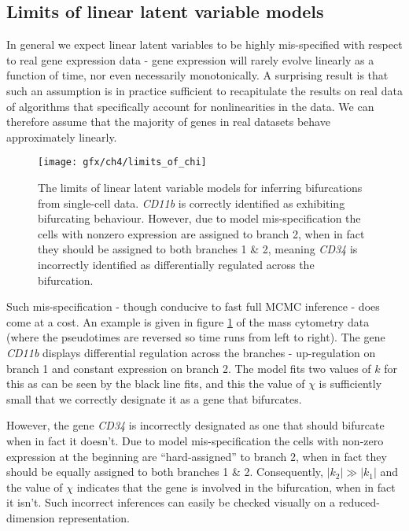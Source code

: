 \subsection{Limits of linear latent variable models}

In general we expect linear latent variables to be highly mis-specified with respect to real gene expression data - gene expression will rarely evolve linearly as a function of time, nor even necessarily monotonically. A surprising result is that such an assumption is in practice sufficient to recapitulate the results on real data of algorithms that specifically account for nonlinearities in the data. We can therefore assume that the majority of genes in real datasets behave approximately linearly.

\begin{figure}
	\centering
	\texttt{[image: gfx/ch4/limits\_of\_chi]}
	\caption[The limits of linear latent variable models for inferring bifurcations from
	single-cell data.]{The limits of linear latent variable models for inferring bifurcations from
	single-cell data. \emph{CD11b} is correctly identified as exhibiting bifurcating behaviour.
	However, due to model mis-specification the cells with nonzero expression are assigned to branch 2, when in fact they should be assigned to both branches 1 \& 2, meaning \emph{CD34} is incorrectly identified as differentially regulated across the bifurcation.} \label{fig:chi}
\end{figure}

Such mis-specification - though conducive to fast full MCMC inference - does come at a cost. An example is given in figure \ref{fig:chi} of the mass cytometry data (where the pseudotimes are reversed so time runs from left to right). The gene \emph{CD11b} displays differential regulation across the branches - up-regulation on branch 1 and constant expression on branch 2. The model fits two values of $k$ for this as can be seen by the black line fits, and this the value of $\chi$ is sufficiently small that we correctly designate it as a gene that bifurcates.

However, the gene \emph{CD34} is incorrectly designated as one that should bifurcate when in fact it doesn't. Due to model mis-specification the cells with non-zero expression at the beginning are ``hard-assigned'' to branch 2, when in fact they should be equally assigned to both branches 1 \& 2. Consequently, $|k_2| \gg |k_1|$ and the value of $\chi$ indicates that the gene is involved in the bifurcation, when in fact it isn't. Such incorrect inferences can easily be checked visually on a reduced-dimension representation.


